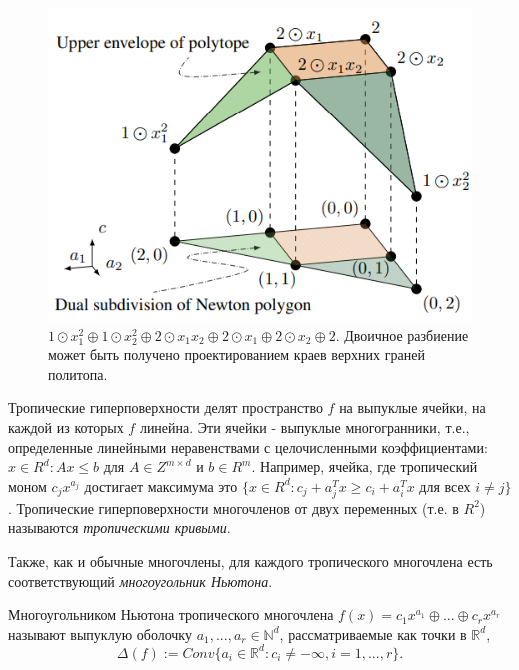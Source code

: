 \documentclass[russian]{lecture-notes}
\begin{document}
	\begin{figure}[h]
		\centering
		\includegraphics{dual_subdivision}
		\caption{$1 \odot x_1^2 \oplus 1 \odot x_2^2 \oplus 2 \odot x_1x_2 \oplus 2 \odot x_1 \oplus 2 \odot x_2 \oplus 2.$ Двоичное разбиение может быть получено проектированием краев верхних граней политопа.}
	\end{figure}

	Тропические гиперповерхности делят пространство $f$ на выпуклые ячейки, на каждой из которых $f$ линейна. Эти ячейки - выпуклые многогранники, т.е., определенные линейными неравенствами с целочисленными коэффициентами: ${x \in R^d : Ax \leq b}$ для $ A \in Z^{m \times d}$ и $b \in R^m$. Например, ячейка, где тропический моном $c_jx^{a_j}$ достигает максимума это $\{x \in R^d : c_j + a_j^Tx \geq c_i + a_i^Tx$ для всех $ i \neq j\}$. Тропические гиперповерхности многочленов от двух переменных (т.е. в $R^2$) называются \textit{тропическими кривыми}.
	
	Также, как и обычные многочлены, для каждого тропического многочлена есть соответствующий \textit{многоугольник Ньютона}.
	
	\begin{Definition}
		Многоугольником Ньютона тропического многочлена $f(x) = c_1x^{a_1} \oplus ... \oplus c_r x^{a_r}$ называют выпуклую оболочку $a_1, ..., a_r \in \mathbb{N}^d$, рассматриваемые как точки в $\mathbb{R}^d$,
		\begin{equation*}
			\Delta(f) := Conv\{a_i \in \mathbb{R}^d : c_i \neq - \infty, i=1,...,r\}.
		\end{equation*}
	\end{Definition}
\end{document}
